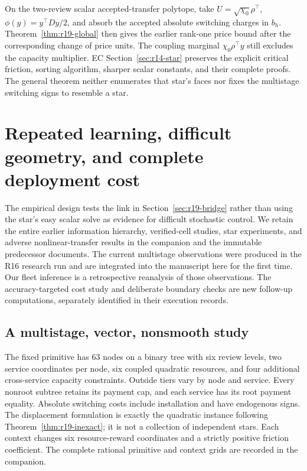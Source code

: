 \documentclass[11pt,letterpaper]{article}
\theoremstyle{definition}
\newcommand{\1}{\mathbf 1}
\begin{document}
On the two-review scalar accepted-transfer polytope, take $U=\sqrt{\chi_0}\rho^\top$, $\phi(y)=y^\top Dy/2$, and absorb the accepted absolute switching charges in $b_h$. Theorem~\ref{thm:r19-global} then gives the earlier rank-one price bound after the corresponding change of price units. The coupling marginal $\chi_0\rho^\top y$ still excludes the capacity multiplier. EC Section~\ref{sec:r14-star} preserves the explicit critical friction, sorting algorithm, sharper scalar constants, and their complete proofs. The general theorem neither enumerates that star's faces nor fixes the multistage switching signs to resemble a star.



\section{Repeated learning, difficult geometry, and complete deployment cost}\label{sec:r19-experiment}
The empirical design tests the link in Section~\ref{sec:r19-bridge} rather than using the star's easy scalar solve as evidence for difficult stochastic control. We retain the entire earlier information hierarchy, verified-cell studies, star experiments, and adverse nonlinear-transfer results in the companion and the immutable predecessor documents. The current multistage observations were produced in the R16 research run and are integrated into the manuscript here for the first time. Our fleet inference is a retrospective reanalysis of those observations. The accuracy-targeted cost study and deliberate boundary checks are new follow-up computations, separately identified in their execution records.

\subsection{A multistage, vector, nonsmooth study}
The fixed primitive has 63 nodes on a binary tree with six review levels, two service coordinates per node, six coupled quadratic resources, and four additional cross-service capacity constraints. Outside tiers vary by node and service. Every nonroot subtree retains its payment cap, and each service has its root payment equality. Absolute switching costs include installation and have endogenous signs. The displacement formulation is exactly the quadratic instance following Theorem~\ref{thm:r19-inexact}; it is not a collection of independent stars. Each context changes six resource-reward coordinates and a strictly positive friction coefficient. The complete rational primitive and context grids are recorded in the companion.
\end{document}
